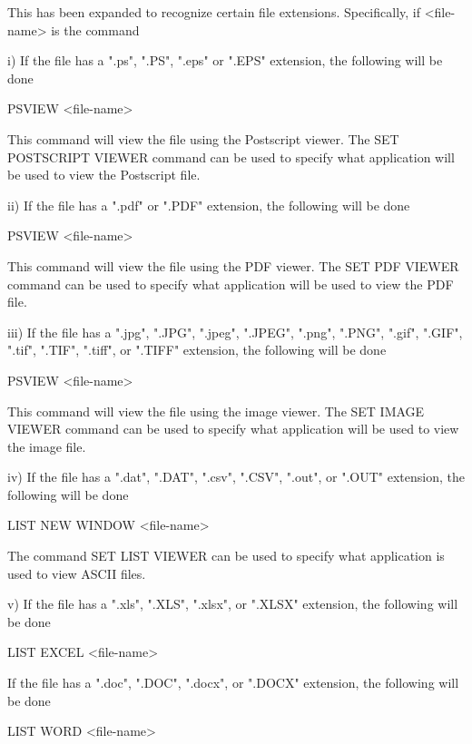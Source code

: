       This has been expanded to recognize certain file extensions.
       Specifically, if <file-name> is the command

           i) If the file has a ".ps", ".PS", ".eps" or ".EPS" extension,
              the following will be done

                  PSVIEW  <file-name>

              This command will view the file using the Postscript
              viewer.  The SET POSTSCRIPT VIEWER command can be used to
              specify what application will be used to view the
              Postscript file.

          ii) If the file has a ".pdf" or ".PDF" extension, the following
              will be done

                  PSVIEW  <file-name>

              This command will view the file using the PDF viewer.  The
              SET PDF VIEWER command can be used to specify what
              application will be used to view the PDF file.

         iii) If the file has a ".jpg", ".JPG", ".jpeg", ".JPEG", ".png",
              ".PNG", ".gif", ".GIF", ".tif", ".TIF", ".tiff",  or ".TIFF"
              extension, the following will be done

                  PSVIEW  <file-name>

              This command will view the file using the image viewer.  The
              SET IMAGE VIEWER command can be used to specify what
              application will be used to view the image file.

          iv) If the file has a ".dat", ".DAT", ".csv", ".CSV", ".out",
              or ".OUT" extension, the following will be done

                  LIST NEW WINDOW  <file-name>

              The command SET LIST VIEWER can be used to specify what
              application is used to view ASCII files.

           v) If the file has a ".xls", ".XLS", ".xlsx", or ".XLSX"
              extension, the following will be done

                  LIST EXCEL  <file-name>

              If the file has a ".doc", ".DOC", ".docx", or ".DOCX"
              extension, the following will be done

                  LIST WORD  <file-name>

